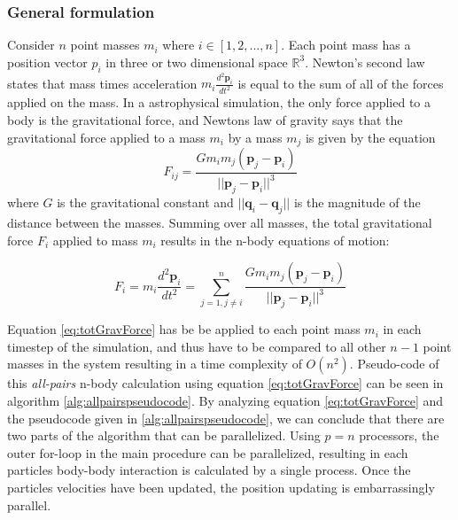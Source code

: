 \subsubsection{General formulation}
Consider $n$ point masses $m_i$ where $i \in [1, 2,..., n]$. Each point mass has a position vector $p_i$ in three or two dimensional space $\mathbb{R}^3$. 
Newton's second law states that mass times acceleration $m_i \frac{d^2 \boldsymbol p_i}{dt^2}$ is equal to the sum of all of the forces applied on the mass. In a astrophysical simulation, the only force applied to a body is the gravitational force, and Newtons law of gravity says that the gravitational force applied to a mass $m_i$ by a mass $m_j$ is given by the equation
\begin{equation}
    F_{ij} = \frac{G m_i m_j (\boldsymbol p_j - \boldsymbol p_i)}{|| \boldsymbol p_j - \boldsymbol p_i|| ^3}
\end{equation}
\noindent where $G$ is the gravitational constant and $|| \boldsymbol q_i - \boldsymbol q_j||$ is the magnitude of the distance between the masses. Summing over all masses, the total gravitational force $F_i$ applied to mass $m_i$ results in the n-body equations of motion:
 
\begin{equation} \label{eq:totGravForce}
    F_i = m_i\frac{d^2 \boldsymbol p_i}{dt^2} = \sum_{j=1, j\neq i}^n \frac{G m_i m_j (\boldsymbol p_j - \boldsymbol p_i)}{|| \boldsymbol p_j - \boldsymbol p_i|| ^3}
\end{equation}

Equation \ref{eq:totGravForce} has be be applied to each point mass $m_i$ in each timestep of the simulation, and thus have to be compared to all other $n-1$ point masses in the system resulting in a time complexity of $O(n^2)$. Pseudo-code of this \textit{all-pairs} n-body calculation using equation \ref{eq:totGravForce} can be seen in algorithm \ref{alg:allpairspseudocode}. By analyzing equation \ref{eq:totGravForce} and the pseudocode given in \ref{alg:allpairspseudocode}, we can conclude that there are two parts of the algorithm that can be parallelized. Using $p=n$ processors, the outer for-loop in the main procedure can be parallelized, resulting in each particles body-body interaction is calculated by a single process. Once the particles velocities have been updated, the position updating is embarrassingly parallel.

